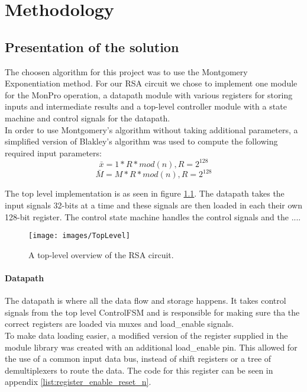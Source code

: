 \chapter{Methodology}
\section{Presentation of the solution}
The choosen algorithm for this project was to use the Montgomery Exponentiation method. For our RSA circuit we chose to implement one module for the MonPro operation, a datapath module with various registers for storing inputs and intermediate results and a top-level controller module with a state machine and control signals for the datapath.\\
In order to use Montgomery's algorithm without taking additional parameters, a simplified version of Blakley's algorithm was used to compute the following required input parameters:
\begin{equation}
    \bar{x}=1*R*mod(n), R=2^{128}
\end{equation}
\begin{equation}
    \bar{M}=M*R*mod(n), R=2^{128}
\end{equation}

The top level implementation is as seen in figure \ref{fig:toplevel}. The datapath takes the input signals 32-bits at a time and these signals are then loaded in each their own 128-bit register. The control state machine handles the control signals and the ....
\begin{figure}[H]
\centering
\texttt{[image: images/TopLevel]}
\caption{A top-level overview of the RSA circuit.}
\label{fig:toplevel}
\end{figure}

\subsubsection{Datapath}
The datapath is where all the data flow and storage happens. It takes control signals from the top level ControlFSM and is responsible for making sure tha the correct registers are loaded via muxes and load\_enable signals.\\
To make data loading easier, a modified version of the register supplied in the module library was created with an additional load\_enable pin. This allowed for the use of a common input data bus, instead of shift registers or a tree of demultiplexers to route the data. The code for this register can be seen in appendix \ref{list:register_enable_reset_n}.

